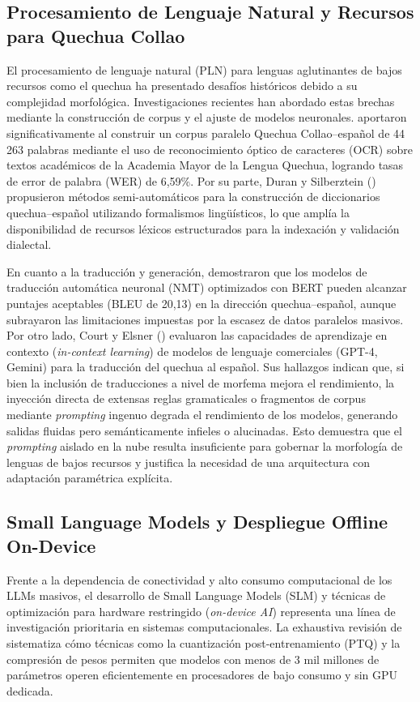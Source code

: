 \subsection{Procesamiento de Lenguaje Natural y Recursos para Quechua Collao}
El procesamiento de lenguaje natural (PLN) para lenguas aglutinantes de bajos recursos como el quechua ha presentado desafíos históricos debido a su complejidad morfológica. Investigaciones recientes han abordado estas brechas mediante la construcción de corpus y el ajuste de modelos neuronales. \citet{Orcotoma2025} aportaron significativamente al construir un corpus paralelo Quechua Collao--español de 44\,263 palabras mediante el uso de reconocimiento óptico de caracteres (OCR) sobre textos académicos de la Academia Mayor de la Lengua Quechua, logrando tasas de error de palabra (WER) de 6,59\%. Por su parte, Duran y Silberztein (\citeyear{Duran2026}) propusieron métodos semi-automáticos para la construcción de diccionarios quechua--español utilizando formalismos lingüísticos, lo que amplía la disponibilidad de recursos léxicos estructurados para la indexación y validación dialectal.

En cuanto a la traducción y generación, \citet{SullaTorres2024} demostraron que los modelos de traducción automática neuronal (NMT) optimizados con BERT pueden alcanzar puntajes aceptables (BLEU de 20,13) en la dirección quechua--español, aunque subrayaron las limitaciones impuestas por la escasez de datos paralelos masivos. Por otro lado, Court y Elsner (\citeyear{Court2024}) evaluaron las capacidades de aprendizaje en contexto (\textit{in-context learning}) de modelos de lenguaje comerciales (GPT-4, Gemini) para la traducción del quechua al español. Sus hallazgos indican que, si bien la inclusión de traducciones a nivel de morfema mejora el rendimiento, la inyección directa de extensas reglas gramaticales o fragmentos de corpus mediante \textit{prompting} ingenuo degrada el rendimiento de los modelos, generando salidas fluidas pero semánticamente infieles o alucinadas. Esto demuestra que el \textit{prompting} aislado en la nube resulta insuficiente para gobernar la morfología de lenguas de bajos recursos y justifica la necesidad de una arquitectura con adaptación paramétrica explícita.

\subsection{Small Language Models y Despliegue Offline On-Device}
Frente a la dependencia de conectividad y alto consumo computacional de los LLMs masivos, el desarrollo de Small Language Models (SLM) y técnicas de optimización para hardware restringido (\textit{on-device AI}) representa una línea de investigación prioritaria en sistemas computacionales. La exhaustiva revisión de \citet{Xu2024} sistematiza cómo técnicas como la cuantización post-entrenamiento (PTQ) y la compresión de pesos permiten que modelos con menos de 3 mil millones de parámetros operen eficientemente en procesadores de bajo consumo y sin GPU dedicada.

